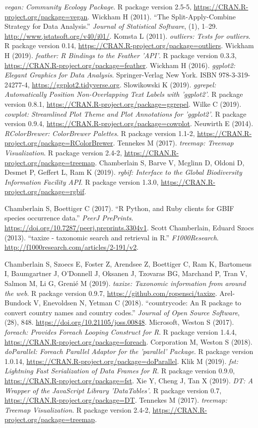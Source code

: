 \emph{vegan: Community Ecology Package}.
R package version 2.5-5, \url{https://CRAN.R-project.org/package=vegan}.
Wickham H (2011).
``The Split-Apply-Combine Strategy for Data Analysis.''
\emph{Journal of Statistical Software}, (1), 1--29.
\url{http://www.jstatsoft.org/v40/i01/}.
Komsta L (2011).
\emph{outliers: Tests for outliers}.
R package version 0.14, \url{https://CRAN.R-project.org/package=outliers}.
Wickham H (2019).
\emph{feather: R Bindings to the Feather 'API'}.
R package version 0.3.3, \url{https://CRAN.R-project.org/package=feather}.
Wickham H (2016).
\emph{ggplot2: Elegant Graphics for Data Analysis}.
Springer-Verlag New York.
ISBN 978-3-319-24277-4, \url{https://ggplot2.tidyverse.org}.
Slowikowski K (2019).
\emph{ggrepel: Automatically Position Non-Overlapping Text Labels with
'ggplot2'}.
R package version 0.8.1, \url{https://CRAN.R-project.org/package=ggrepel}.
Wilke C (2019).
\emph{cowplot: Streamlined Plot Theme and Plot Annotations for 'ggplot2'}.
R package version 0.9.4, \url{https://CRAN.R-project.org/package=cowplot}.
Neuwirth E (2014).
\emph{RColorBrewer: ColorBrewer Palettes}.
R package version 1.1-2, \url{https://CRAN.R-project.org/package=RColorBrewer}.
Tennekes M (2017).
\emph{treemap: Treemap Visualization}.
R package version 2.4-2, \url{https://CRAN.R-project.org/package=treemap}.
Chamberlain S, Barve V, Mcglinn D, Oldoni D, Desmet P, Geffert L, Ram K (2019).
\emph{rgbif: Interface to the Global Biodiversity Information Facility API}.
R package version 1.3.0, \url{https://CRAN.R-project.org/package=rgbif}.

Chamberlain S, Boettiger C (2017).
``R Python, and Ruby clients for GBIF species occurrence data.''
\emph{PeerJ PrePrints}.
\url{https://doi.org/10.7287/peerj.preprints.3304v1}.
Scott Chamberlain, Eduard Szocs (2013).
``taxize - taxonomic search and retrieval in R.''
\emph{F1000Research}.
\url{http://f1000research.com/articles/2-191/v2}.

Chamberlain S, Szoecs E, Foster Z, Arendsee Z, Boettiger C, Ram K, Bartomeus I, Baumgartner J, O'Donnell J, Oksanen J, Tzovaras BG, Marchand P, Tran V, Salmon M, Li G, Grenié M (2019).
\emph{taxize: Taxonomic information from around the web}.
R package version 0.9.7, \url{https://github.com/ropensci/taxize}.
Arel-Bundock V, Enevoldsen N, Yetman C (2018).
``countrycode: An R package to convert country names and country codes.''
\emph{Journal of Open Source Software}, (28), 848.
\url{https://doi.org/10.21105/joss.00848}.
Microsoft, Weston S (2017).
\emph{foreach: Provides Foreach Looping Construct for R}.
R package version 1.4.4, \url{https://CRAN.R-project.org/package=foreach}.
Corporation M, Weston S (2018).
\emph{doParallel: Foreach Parallel Adaptor for the 'parallel' Package}.
R package version 1.0.14, \url{https://CRAN.R-project.org/package=doParallel}.
Klik M (2019).
\emph{fst: Lightning Fast Serialization of Data Frames for R}.
R package version 0.9.0, \url{https://CRAN.R-project.org/package=fst}.
Xie Y, Cheng J, Tan X (2019).
\emph{DT: A Wrapper of the JavaScript Library 'DataTables'}.
R package version 0.7, \url{https://CRAN.R-project.org/package=DT}.
Tennekes M (2017).
\emph{treemap: Treemap Visualization}.
R package version 2.4-2, \url{https://CRAN.R-project.org/package=treemap}.
